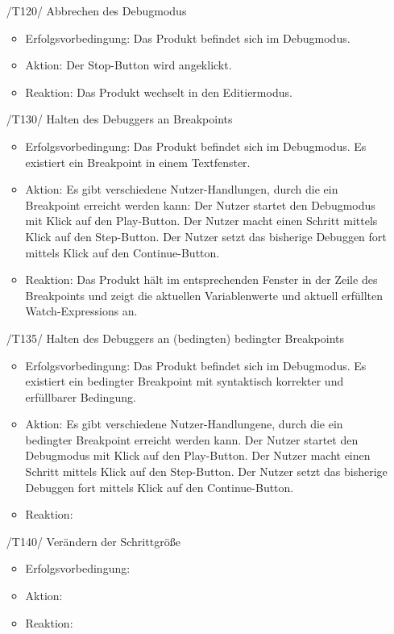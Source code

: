 \documentclass[parskip=full]{scrartcl}
\begin{document}
\begin{itemize}
	\item[/T120/] Abbrechen des Debugmodus
		\begin{itemize}
		\item Erfolgsvorbedingung: Das Produkt befindet sich im Debugmodus.
		\item Aktion: Der Stop-Button wird angeklickt.
		\item Reaktion: Das Produkt wechselt in den Editiermodus.		
		\end{itemize}		
	
	\item[/T130/] Halten des Debuggers an Breakpoints
		\begin{itemize}
		\item Erfolgsvorbedingung: Das Produkt befindet sich im Debugmodus. Es existiert ein Breakpoint in einem Textfenster.
		\item Aktion: Es gibt verschiedene Nutzer-Handlungen, durch die ein Breakpoint erreicht werden kann: Der Nutzer startet den Debugmodus mit Klick auf den Play-Button. Der Nutzer macht einen Schritt mittels Klick auf den Step-Button. Der Nutzer setzt das bisherige Debuggen fort mittels Klick auf den Continue-Button.
		\item Reaktion:	Das Produkt hält im entsprechenden Fenster in der Zeile des \glspl{Breakpoint} und zeigt die aktuellen Variablenwerte und aktuell erfüllten Watch-Expressions an.
		\end{itemize}		
	
	\item[/T135/] Halten des Debuggers an (bedingten) \glspl{bedingter Breakpoint}
		\begin{itemize}
		\item Erfolgsvorbedingung: Das Produkt befindet sich im \gls{Debugmodus}. Es existiert ein bedingter Breakpoint mit syntaktisch korrekter und erfüllbarer Bedingung. 
		\item Aktion: Es gibt verschiedene Nutzer-Handlungene, durch die ein bedingter Breakpoint erreicht werden kann. Der Nutzer startet den Debugmodus mit Klick auf den Play-Button. Der Nutzer macht einen Schritt mittels Klick auf den Step-Button. Der Nutzer setzt das bisherige Debuggen fort mittels Klick auf den Continue-Button.
		\item Reaktion:		
		\end{itemize}	
	
	\item[/T140/] Verändern der Schrittgröße
		\begin{itemize}
		\item Erfolgsvorbedingung:
		\item Aktion:
		\item Reaktion:		
		\end{itemize}	
	

\end{itemize}
\end{document}
